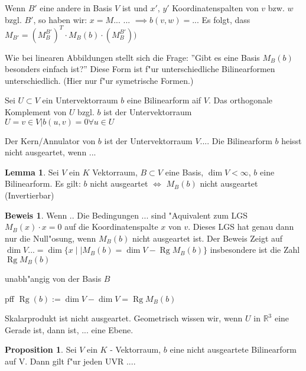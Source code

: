 \documentclass[fontsize=11pt,paper=a4,BCOR=0mm,DIV=11,automark,headsepline]{scrbook}
\DeclareMathOperator{\mRg}{Rg}
\theoremstyle{remark}
\theoremstyle{definition}
\newtheorem*{proposition}{Proposition}
\newtheorem{lemma}{Lemma}[section]
\theoremstyle{proof}
\newtheorem*{prof}{Beweis}
\theoremstyle{remark}
\begin{document}
Wenn $B'$ eine andere in Basis $V$ ist und $x'$, $y'$ Koordinatenspalten von $v$
bzw. $w$ bzgl. $B'$, so haben wir: $x=M...$ ...  $\implies b(v,w)= ...$ Es
folgt, dass $M_{B'}= (M^{B'}_{B})^T\cdot M_B(b)\cdot (M^{B'}_{B}))$

Wie bei linearen Abbildungen stellt sich die Frage: ''Gibt es eine Basis
$M_B(b)$ besonders einfach ist?'' Diese Form ist f"ur unterschiedliche
Bilinearformen unterschiedlich. (Hier nur f"ur symetrische Formen.)

\begin{definition}
  Sei $U\subset V$ ein Untervektorraum $b$ eine Bilinearform aif $V$. Das
  orthogonale Komplement von $U$ bzgl. $b$ ist der Untervektorraum $U={v\in
    V|b(u,v)=0 \forall u\in U}$

  Der Kern/Annulator von $b$ ist der Untervektorraum $V....$ Die Bilinearform
  $b$ heisst nicht ausgeartet, wenn ...
\end{definition}

\begin{lemma}
  Sei $V$ ein $K$ Vektorraum, $B\subset V$ eine Basis, $\dim V < \infty$, $b$
  eine Bilinearform. Es gilt: $b$ nicht ausgeartet $\iff$ $M_B(b)$ nicht
  ausgeartet (Invertierbar)
\end{lemma}

\begin{prof}
  Wenn ..
  Die Bedingungen ... sind "Aquivalent zum LGS $M_B(x) \cdot x = 0 $  auf die
  Koordinatenspalte $x$ von $v$. Dieses LGS hat genau dann nur die Null"osung,
  wenn $M_B(b)$ nicht ausgeartet ist. Der Beweis Zeigt auf $\dim V... = \dim
  \{x\mid|  M_B(b)= \dim V - \mRg M_B(b)\}$ insbesondere ist die Zahl $\mRg M_B(b)$

  unabh"angig von der Basis $B$
\end{prof}

\begin{definition}{pff}{}
  \(\mRg(b):=\dim V - \dim V = \mRg M_B(b)\)
\end{definition}

\begin{exa}
  Skalarprodukt ist nicht ausgeartet. Geometrisch wissen wir, wenn $U$ in
  $\mathbb{R}^3$ eine Gerade ist, dann ist, ... eine Ebene.
\end{exa}

\begin{proposition}
  Sei $V$ ein $K$ - Vektorraum, $b$ eine nicht ausgeartete Bilinearform auf V.
  Dann gilt f"ur jeden UVR ....
\end{proposition}
\end{document}
